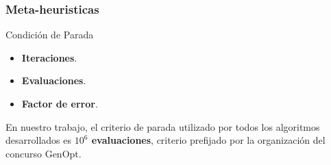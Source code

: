 \begin{frame}
\frametitle{Meta-heuristicas}
\begin{block}{Condición de Parada}
\begin{itemize}
    \item \textbf{Iteraciones}.
    \item \textbf{Evaluaciones}.
    \item \textbf{Factor de error}.
\end{itemize}
\end{block}
\begin{block}{}
En nuestro trabajo, el criterio de parada utilizado por todos los algoritmos desarrollados es \textbf{$10^{6}$ evaluaciones}, criterio prefijado por la organización del concurso GenOpt. 
\end{block}
\end{frame}
